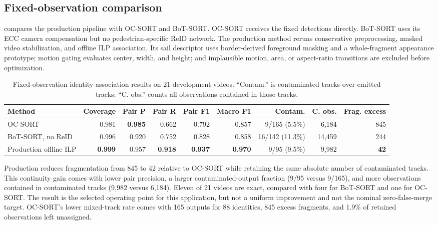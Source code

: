 \subsection{Fixed-observation comparison}

 compares the production pipeline with OC-SORT and
BoT-SORT.  OC-SORT receives the fixed detections directly.  BoT-SORT uses its ECC
camera compensation but no pedestrian-specific ReID network.  The production method
reruns conservative preprocessing, masked video stabilization, and offline ILP
association.  Its sail descriptor uses border-derived foreground masking and a
whole-fragment appearance prototype; motion gating evaluates center, width, and
height; and implausible motion, area, or aspect-ratio transitions are excluded before
optimization.

\begin{table}[t]
  \centering
  \footnotesize
  \caption{Fixed-observation identity-association results on 21 development videos.
  ``Contam.'' is contaminated tracks over emitted tracks; ``C. obs.'' counts all
  observations contained in those tracks.}
  \label{tab:association-benchmark}
  \begin{tabular}{lrrrrrrrr}
    \toprule
    Method & Coverage & Pair P & Pair R & Pair F1 & Macro F1 & Contam. & C. obs. & Frag. excess \\
    \midrule
    OC-SORT & 0.981 & \textbf{0.985} & 0.662 & 0.792 & 0.857 & 9/165 (5.5\%) & 6,184 & 845 \\
    BoT-SORT, no ReID & 0.996 & 0.920 & 0.752 & 0.828 & 0.858 & 16/142 (11.3\%) & 14,459 & 244 \\
    Production offline ILP & \textbf{0.999} & 0.957 & \textbf{0.918} & \textbf{0.937} & \textbf{0.970} & 9/95 (9.5\%) & 9,982 & \textbf{42} \\
    \bottomrule
  \end{tabular}
\end{table}

Production reduces fragmentation from 845 to 42 relative to OC-SORT while retaining
the same absolute number of contaminated tracks.  This continuity gain comes with
lower pair precision, a larger contaminated-output fraction (9/95 versus 9/165), and
more observations contained in contaminated tracks (9,982 versus 6,184).  Eleven of
21 videos are exact, compared with four for BoT-SORT and one for OC-SORT.  The result
is the selected operating point for this application, but not a uniform
improvement and not the nominal zero-false-merge target.  OC-SORT's lower mixed-track
rate comes with 165 outputs for 88 identities, 845 excess fragments, and 1.9\% of
retained observations left unassigned.


